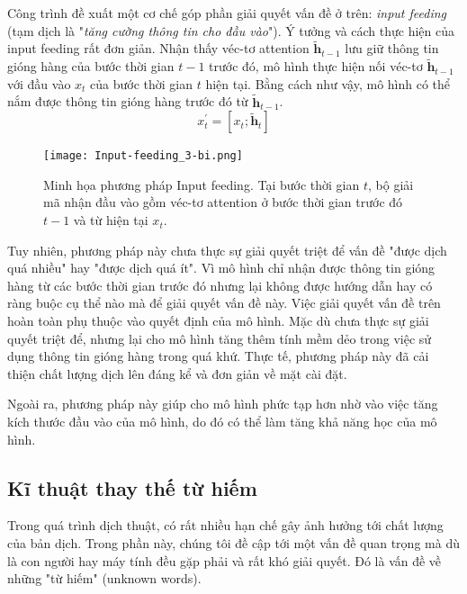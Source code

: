 Công trình \cite{attentionThangLuong2015} đề xuất một cơ chế góp phần giải quyết vấn đề ở trên: \textit{input feeding} (tạm dịch là "\textit{tăng cường thông tin cho đầu vào}"). Ý tưởng và cách thực hiện của input feeding rất đơn giản. Nhận thấy véc-tơ attention $\bm{\tilde{h}}_{t-1}$ lưu giữ thông tin gióng hàng của bước thời gian $t-1$ trước đó, mô hình thực hiện nối véc-tơ $\bm{\tilde{h}}_{t-1}$ với đầu vào $x_t$ của bước thời gian $t$ hiện tại. Bằng cách như vậy, mô hình có thể nắm được thông tin gióng hàng trước đó từ $\bm{\tilde{h}}_{t-1}$.
\begin{equation}
x^{'}_t = [x_t; \bm{\tilde{h}}_t]
\end{equation}

\begin{figure}
	\centering
	\texttt{[image: Input-feeding\_3-bi.png]}
	\caption[Minh họa cơ chế Attention Cục bộ.]{Minh họa phương pháp Input feeding. Tại bước thời gian $t$, bộ giải mã nhận đầu vào gồm véc-tơ attention ở bước thời gian trước đó $t-1$ và từ hiện tại $x_t$.}
	\label{fig_Input_feeding}
\end{figure}
Tuy nhiên, phương pháp này chưa thực sự giải quyết triệt để vấn đề "được dịch quá nhiều" hay "được dịch quá ít". Vì mô hình chỉ nhận được thông tin gióng hàng từ các bước thời gian trước đó nhưng lại không được hướng dẫn hay có ràng buộc cụ thể nào mà để giải quyết vấn đề này. Việc giải quyết vấn đề trên hoàn toàn phụ thuộc vào quyết định của mô hình. Mặc dù chưa thực sự giải quyết triệt để, nhưng lại cho mô hình tăng thêm tính mềm dẻo trong việc sử dụng thông tin gióng hàng trong quá khứ. Thực tế, phương pháp này đã cải thiện chất lượng dịch lên đáng kể và đơn giản về mặt cài đặt.

Ngoài ra, phương pháp này giúp cho mô hình phức tạp hơn nhờ vào việc tăng kích thước đầu vào của mô hình, do đó có thể làm tăng khả năng học của mô hình.

\subsection{Kĩ thuật thay thế từ hiếm}
Trong quá trình dịch thuật, có rất nhiều hạn chế gây ảnh hưởng tới chất lượng của bản dịch. Trong phần này, chúng tôi đề cập tới một vấn đề quan trọng mà dù là con người hay máy tính đều gặp phải và rất khó giải quyết. Đó là vấn đề về những "từ hiếm" (unknown words). 

